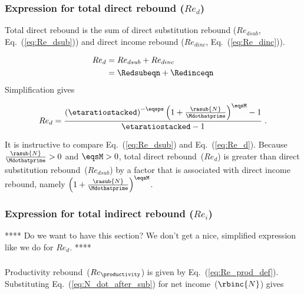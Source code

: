 \subsubsection{Expression for total direct rebound ($Re_d$)} 
\label{sec:Re_d}

Total direct rebound is the sum of 
direct substitution rebound ($Re_{dsub}$, Eq.~(\ref{eq:Re_dsub})) and
direct income rebound ($Re_{dinc}$, Eq.~(\ref{eq:Re_dinc})).

\begin{align} 
  Re_d &= Re_{dsub} + Re_{dinc} \nonumber \\
       &= \Redsubeqn + \Redinceqn
\end{align}
%
Simplification gives

\begin{equation} \label{eq:Re_d}
  Re_d = \frac{ \left( \etaratiostacked \right)^{-\eqsps}
             \left( 1 + \frac{\rasub{N}}{\Mdothatprime} \right)^{\eqsM}   - 1}
         {\etaratiostacked - 1} \; .
\end{equation}

It is instructive to compare Eq.~(\ref{eq:Re_dsub}) and Eq.~(\ref{eq:Re_d}).
Because 
$\frac{\rasub{N}}{\Mdothatprime} > 0$ and 
$\eqsM > 0$,
total direct rebound~($Re_d$) is greater than 
direct substitution rebound~($Re_{dsub}$) by a factor
that is associated with direct income rebound, namely
$\left( 1 + \frac{\rasub{N}}{\Mdothatprime} \right)^{\eqsM}$.


\subsubsection{Expression for total indirect rebound ($Re_i$)} 
\label{sec:Re_i}

****
Do we want to have this section? 
We don't get a nice, simplified expression like we do for $Re_{d}$.
****


\subsubsection{\Prodeffect{}} 
\label{sec:Re_prod}

Productivity rebound~($Re_{\productivity}$) is given by Eq.~(\ref{eq:Re_prod_def}).
Substituting Eq.~(\ref{eq:N_dot_after_sub}) for net income~($\rbinc{N}$) gives

